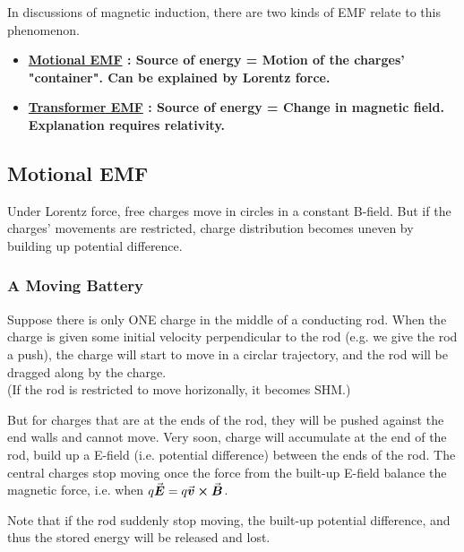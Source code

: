 \documentclass[class=article, crop=false, 12pt]{standalone}
\begin{document}
In discussions of magnetic induction, 
there are two kinds of EMF relate to this phenomenon.
\begin{itemize}
    \item \bf{\ul{Motional EMF}} : Source of energy = Motion of the charges' "container".
    Can be explained by Lorentz force.

    \item \bf{\ul{Transformer EMF}} : Source of energy = Change in magnetic field.
    Explanation requires relativity.
\end{itemize}


\subsection{Motional EMF}

Under Lorentz force, 
free charges move in circles in a constant B-field.
But if the charges' movements are restricted, 
charge distribution becomes uneven by building up potential difference. 

\subsubsection{A Moving Battery}

Suppose there is only ONE charge in the middle of a conducting rod.
When the charge is given some initial velocity perpendicular to the rod
(e.g. we give the rod a push),
the charge will start to move in a circlar trajectory, 
and the rod will be dragged along by the charge. \\

(If the rod is restricted to move horizonally, it becomes SHM.)


But for charges that are at the ends of the rod,
they will be pushed against the end walls and cannot move.
Very soon, charge will accumulate at the end of the rod, 
build up a E-field (i.e. potential difference) between the ends of the rod. 
The central charges stop moving once the force from the built-up E-field balance the magnetic force, 
i.e. when $q\va*{E} = q\va*{v}\cross \va*{B}$.


Note that if the rod suddenly stop moving,  
the built-up potential difference,
and thus the stored energy will be released and lost.
\begin{center}
\end{center}
\end{document}
